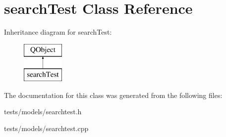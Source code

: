 \hypertarget{classsearchTest}{\section{search\+Test Class Reference}
\label{classsearchTest}
}
Inheritance diagram for search\+Test\+:\begin{figure}[H]
\begin{center}
\leavevmode
\includegraphics[height=2.000000cm]{d7/d51/classsearchTest}
\end{center}
\end{figure}


The documentation for this class was generated from the following files\+:\begin{DoxyCompactItemize}
\item 
tests/models/searchtest.\+h\item 
tests/models/searchtest.\+cpp\end{DoxyCompactItemize}
